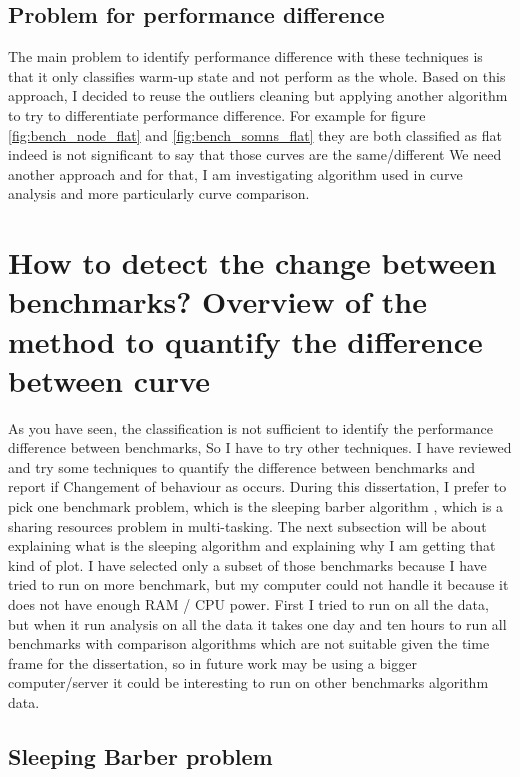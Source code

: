 \documentclass{article}
\begin{document}
\subsection{Problem for performance difference}

The main problem to identify performance difference with these techniques is that it only classifies warm-up state and not perform as the whole. Based on this approach, I decided to reuse the outliers cleaning but applying another algorithm to try to differentiate performance difference. For example for figure \ref{fig:bench_node_flat} and \ref{fig:bench_somns_flat} they are both classified as flat indeed is not significant to say that those curves are the same/different We need another approach and for that, I am investigating algorithm used in curve analysis and more particularly curve comparison.




\section{ How to detect the change between benchmarks? Overview of the method to quantify the difference between curve}

As you have seen, the classification is not sufficient to identify the performance difference between benchmarks, So I have to try other techniques. I have reviewed and try some techniques to quantify the difference between benchmarks and report if Changement of behaviour as occurs. During this dissertation, I prefer to pick one benchmark problem, which is the sleeping barber algorithm \citep{reynolds2002linda}, which is a sharing resources problem in multi-tasking. The next subsection will be about explaining what is the sleeping algorithm and explaining why I am getting that kind of plot. I have selected only a subset of those benchmarks because I have tried to run on more benchmark, but my computer could not handle it because it does not have enough RAM / CPU power. First I tried to run on all the data, but when it run analysis on all the data it takes one day and ten hours to run all benchmarks with comparison algorithms which are not suitable given the time frame for the dissertation, so in future work may be using a bigger computer/server it could be interesting to run on other benchmarks algorithm data.

\subsection{Sleeping Barber problem}
\end{document}
